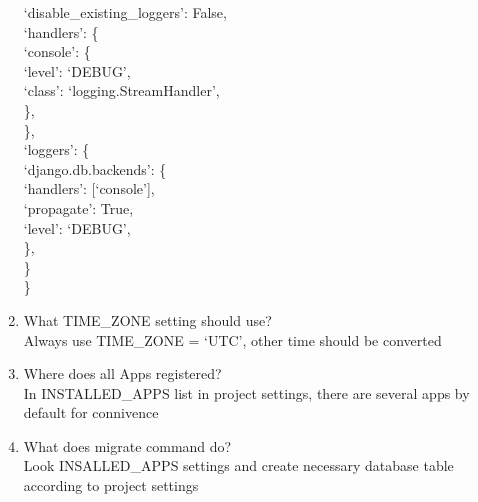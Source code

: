 \documentclass[10pt,a4paper,oneside]{article}
\begin{document}
\begin{enumerate}[1.]
\indent\quad\quad	`disable\_existing\_loggers': False,\\
\indent\quad\quad	`handlers': \{\\
\indent\quad\quad\quad		`console': \{\\
\indent\quad\quad\quad\quad		`level': `DEBUG',\\
\indent\quad\quad\quad\quad		`class': `logging.StreamHandler',\\
\indent\quad\quad\quad		\},\\
\indent\quad\quad	\},\\
\indent\quad\quad	`loggers': \{\\
\indent\quad\quad\quad		`django.db.backends': \{\\
\indent\quad\quad\quad\quad		`handlers': [`console'],\\
\indent\quad\quad\quad\quad		`propagate': True,\\
\indent\quad\quad\quad\quad		`level': `DEBUG',\\
\indent\quad\quad\quad		\},\\
\indent\quad\quad	\}\\
\indent\quad\}
\item What TIME\_ZONE setting should use?\\
Always use TIME\_ZONE = `UTC', other time should be converted
\item Where does all Apps registered?\\
In INSTALLED\_APPS list in project settings, there are several apps by default for connivence 
\item What does migrate command do?\\
Look INSALLED\_APPS settings and create necessary database table according to project settings
\end{enumerate}
\end{document}
